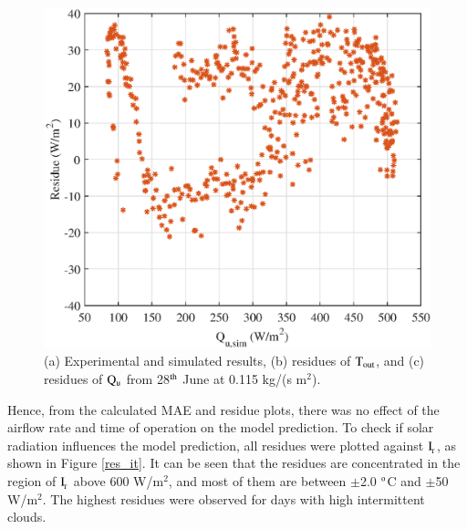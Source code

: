 \begin{figure}[ht!]
\begin{minipage}{0.39\columnwidth}
		\includegraphics[scale=0.5,width=1.0\columnwidth]{figs/0115-residue-6.eps}
	\end{minipage}
	
	\caption{(a) Experimental and simulated results, (b) residues of $\rm{T_{out}}$, and (c) residues of $\rm{Q_{u}}$ from 28$^{\rm{th}}$ June at 0.115 kg/(s m$^2$).}
	\label{0115-3}
\end{figure}


\newpage
Hence, from the calculated MAE and residue plots, there was no effect of the airflow rate and time of operation on the model prediction. To check if solar radiation influences the model prediction, all residues were plotted against $\rm{I_{\!_T}}$, as shown in Figure \ref{res_it}. It can be seen that the residues are concentrated in the region of $\rm{I_{\!_T}}$ above 600 W/m$^2$, and most of them are between $\pm$2.0 $^{\rm{o}}$C and $\pm$50 W/m$^2$. The highest residues were observed for days with high intermittent clouds.

